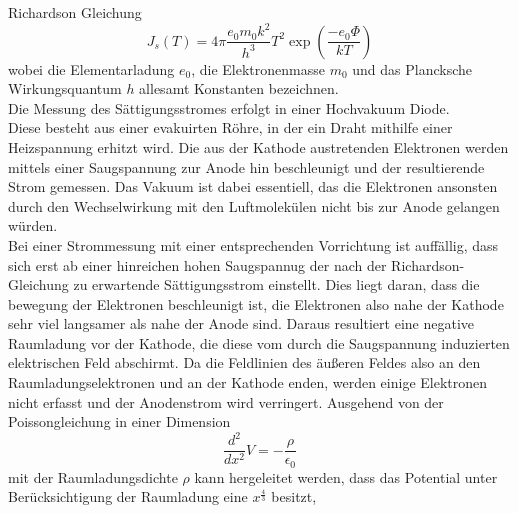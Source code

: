 Richardson Gleichung
\begin{equation}
J_s(T)=4\pi\frac{e_0m_0k^2}{h^3}T^2\exp(\frac{-e_0\Phi}{kT})
\end{equation}
wobei die Elementarladung $e_0$, die Elektronenmasse $m_0$ und das Plancksche Wirkungsquantum $h$ allesamt Konstanten bezeichnen. \\
Die Messung des Sättigungsstromes erfolgt in einer Hochvakuum Diode. \\ Diese besteht aus einer evakuirten Röhre, in der ein Draht mithilfe einer
Heizspannung erhitzt wird. Die aus der Kathode austretenden Elektronen werden mittels einer Saugspannung zur Anode hin beschleunigt
und der resultierende Strom gemessen. Das Vakuum ist dabei essentiell, das die Elektronen ansonsten durch den Wechselwirkung mit den Luftmolekülen nicht 
bis zur Anode gelangen würden. \\
Bei einer Strommessung mit einer entsprechenden Vorrichtung ist auffällig, dass sich erst ab einer hinreichen hohen Saugspannug 
der nach der Richardson-Gleichung zu erwartende Sättigungsstrom einstellt. Dies liegt daran, dass die bewegung der Elektronen beschleunigt ist,
die Elektronen also nahe der Kathode sehr viel langsamer als nahe der Anode sind. Daraus resultiert eine negative Raumladung vor der Kathode,
die diese vom durch die Saugspannung induzierten elektrischen Feld abschirmt. Da die Feldlinien des äußeren Feldes also an den Raumladungselektronen 
und an der Kathode enden, werden einige Elektronen nicht erfasst und der Anodenstrom wird verringert.
Ausgehend von der Poissongleichung in einer Dimension 
\begin{equation}
\frac{d^2}{dx^2}V=-\frac{\rho}{\epsilon_0}
\end{equation}
mit der Raumladungsdichte $\rho$ kann hergeleitet werden, dass das Potential unter Berücksichtigung der Raumladung eine $x^{\frac{4}{3}}$ besitzt, 
